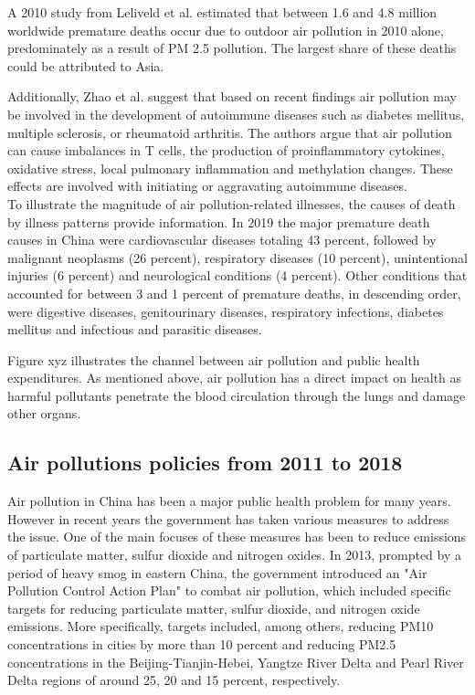 \documentclass[]{article}
\begin{document}
A 2010 study from Leliveld et al. estimated that between 1.6 and 4.8 million worldwide premature deaths occur due to outdoor air pollution in 2010 alone, predominately as a result of PM 2.5 pollution. The largest share of these deaths could be attributed to Asia. 

Additionally, Zhao et al. suggest that based on recent findings air pollution may be involved in the development of autoimmune diseases such as diabetes mellitus, multiple sclerosis, or rheumatoid arthritis. The authors argue that air pollution can cause imbalances in T cells, the production of proinflammatory cytokines, oxidative stress, local pulmonary inflammation and methylation changes. These effects are involved with initiating or aggravating autoimmune diseases. \\ %

To illustrate the magnitude of air pollution-related illnesses, the causes of death by illness patterns provide information. In 2019 the major premature death causes in China were cardiovascular diseases totaling 43 percent, followed by malignant neoplasms (26 percent), respiratory diseases (10 percent), unintentional injuries (6 percent) and neurological conditions (4 percent). Other conditions that accounted for between 3 and 1 percent of premature deaths, in descending order, were digestive diseases, genitourinary diseases, respiratory infections, diabetes mellitus and infectious and parasitic diseases. %

Figure xyz illustrates the channel between air pollution and public health expenditures. As mentioned above, air pollution has a direct impact on health as harmful pollutants penetrate the blood circulation through the lungs and damage other organs.


\subsection{Air pollutions policies from 2011 to 2018}

Air pollution in China has been a major public health problem for many years. However in recent years the government has taken various measures to address the issue. One of the main focuses of these measures has been to reduce emissions of particulate matter, sulfur dioxide and nitrogen oxides. 
In 2013, prompted by a period of heavy smog in eastern China, the government introduced an "Air Pollution Control Action Plan" to combat air pollution, which included specific targets for reducing particulate matter, sulfur dioxide, and nitrogen oxide emissions. More specifically, targets included, among others, reducing PM10 concentrations in cities by more than 10 percent and reducing PM2.5 concentrations in the Beijing-Tianjin-Hebei, Yangtze River Delta and Pearl River Delta regions of around 25, 20 and 15 percent, respectively. %
\end{document}
